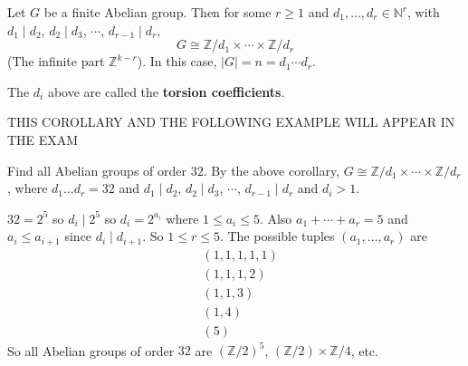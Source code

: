 \begin{corollary}
	Let $G$ be a finite Abelian group. Then for some $r \ge 1$ and $d_1, \dots, d_r \in \mathbb{N}^r$, with $d_1 \mid d_2$, $d_2 \mid d_3$, $\cdots$, $d_{r - 1} \mid d_r$,
	\[
		G \cong \mathbb{Z} / d_1 \times \cdots \times \mathbb{Z} / d_r
	\]
	(The infinite part $\mathbb{Z}^{k - r}$). In this case, $|G| = n = d_1 \cdots d_r$.
\end{corollary}

\begin{definition}
	The $d_i$ above are called the \textbf{torsion coefficients}.
\end{definition}

THIS COROLLARY AND THE FOLLOWING EXAMPLE WILL APPEAR IN THE EXAM

\begin{example}
	Find all Abelian groups of order $32$. By the above corollary, $G \cong \mathbb{Z} / d_1 \times \cdots \times \mathbb{Z} / d_r$, where $d_1 \dots d_r = 32$ and $d_1 \mid d_2$, $d_2 \mid d_3$, $\cdots$, $d_{r - 1} \mid d_r$ and $d_i > 1$.

	$32 = 2^5$ so $d_i \mid 2^5$ so $d_i = 2^{a_i}$ where $1 \le a_i \le 5$. Also $a_1 + \cdots + a_r = 5$ and $a_i \le a_{i + 1}$ since $d_i \mid d_{i + 1}$. So $1 \le r \le 5$. The possible tuples $(a_1, \dots, a_r)$ are
	\[
		\begin{aligned}
			& (1, 1, 1, 1, 1) \\
			& (1, 1, 1, 2) \\
			& (1, 1, 3) \\
			& (1, 4) \\
			& (5)
		\end{aligned}
	\]
	So all Abelian groups of order $32$ are ${(\mathbb{Z} / 2 )}^5$, ${(\mathbb{Z} / 2)} \times \mathbb{Z} / 4$, etc.
\end{example}

